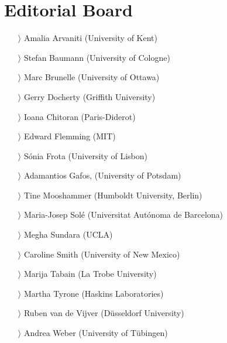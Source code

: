 \documentclass[
notumble,
nofoldmark,
]{leaflet}
\begin{document}
 
{
    \color{LIGHTGRAY}
    \section{Editorial Board}    

    \begin{itemize}
    \item[$\rangle$] Amalia Arvaniti (University of Kent)
    \item[$\rangle$] Stefan Baumann (University of Cologne)
    \item[$\rangle$] Marc Brunelle (University of Ottawa)
    \item[$\rangle$] Gerry Docherty (Griffith University)
    \item[$\rangle$] Ioana Chitoran (Paris-Diderot)
    \item[$\rangle$] Edward Flemming (MIT)
    \item[$\rangle$] S\'onia Frota (University of Lisbon)
    \item[$\rangle$] Adamantios Gafos, (University of Potsdam)
    \item[$\rangle$] Tine Mooshammer (Humboldt University, Berlin)
    \item[$\rangle$] Maria-Josep Sol\'e (Universitat Aut\'onoma de Barcelona)
    \item[$\rangle$] Megha Sundara (UCLA)
    \item[$\rangle$] Caroline Smith (University of New Mexico)
    \item[$\rangle$] Marija Tabain (La Trobe University)
    \item[$\rangle$] Martha Tyrone (Haskins Laboratories)
    \item[$\rangle$] Ruben van de Vijver (D\"usseldorf University)
    \item[$\rangle$] Andrea Weber (University of T\"ubingen) 
    \end{itemize}
}
 
\end{document}
